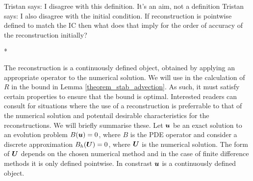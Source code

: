 \documentclass[final]{amsart}
\renewcommand{\vect}[1]{\geovec{#1}}
\newcommand{\tristan}[1]{{\color{purple} Tristan says:  #1 }}
\numberwithin{equation}{section}
\begin{document}
\tristan{I disagree with this definition. It's an aim, not a
  definition} \tristan{I also disagree with the initial condition. If
  reconstruction is pointwise defined to match the IC then what does
  that imply for the order of accuracy of the reconstruction initially?}

\/*

 The  reconstruction is a continuously defined object, obtained by applying an appropriate operator to the numerical solution. We will use in the calculation of $R$ in the bound in Lemma \ref{theorem_stab_advection}.  As such, it must satisfy certain properties to ensure that the bound  is optimal.  Interested readers can consult \cite[\S2]{makridakis2007space} for situations where the use of a reconstruction is preferrable to that of the numerical solution and potentail desirable characteristics for the reconstructions.  We will briefly summarise these.
Let $\vect u$ be an exact solution to an evolution problem $B\qp{\vect u}=0$, where $B$ is the PDE operator and consider a discrete approximation $B_h\qp{\vect U}=0$, where $\vect U$ is the numerical solution.  The form of $\vect U$ depends on the chosen numerical method and in the case of finite difference methods it is only defined pointwise. In constrast $\vect u$ is a continuously defined object.
\end{document}
